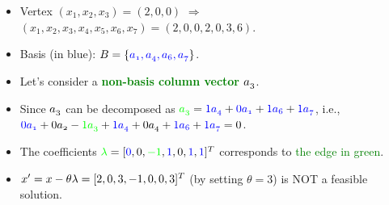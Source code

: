 \documentclass[mathserif]{beamer}
\begin{document}
{\begin{scriptsize}

\begin{itemize}
 \item Vertex  $(x_1,x_2,x_3)=(2,0, 0)$ $\Rightarrow$ $(x_1,x_2,x_3,x_4,x_5,x_6,x_7) = ( 2, 0, 0, 2, 0, 3, 6 )$.
  \item Basis (in blue): $\mathnormal{B =\{ \textcolor{blue}{a_1, a_4, a_6, a_7} \} }$.
 \item  Let's consider a \textcolor{green}{\bf non-basis column vector $\mathnormal{a_3}$}. 
 \item  Since $\mathnormal{a_3}$ can be decomposed as  $\mathnormal{ \textcolor{green}{a_{3}} }=   \textcolor{blue}{1 \mathnormal{a_{4}} } + \textcolor{blue}{0 \mathnormal{a_{1}} }  + \textcolor{blue}{1 \mathnormal{a_{6}} }   + \textcolor{blue}{1 \mathnormal{a_{7}}}$, i.e., 
 $\textcolor{blue}{0 \mathnormal{a_{1}} }  +  \textcolor{black}{0 \mathnormal{a_{2}} } -  \textcolor{green}{1 \mathnormal{a_{3}} }  +  \textcolor{blue}{1 \mathnormal{a_{4}} } +  \textcolor{black}{0 \mathnormal{a_{4}} } + \textcolor{blue}{1 \mathnormal{a_{6}} }   + \textcolor{blue}{1 \mathnormal{a_{7}}} = 0$.
  \item The coefficients   $ \textcolor{green} { \mathnormal{\lambda}} = [ \textcolor{blue}{0}, 0, \textcolor{green}{-1},  \textcolor{blue}{1}, 0,  \textcolor{blue}{1},  \textcolor{blue}{1} ]^T$ corresponds to \textcolor{green}{the  edge in green}. 
    \item $\mathnormal{x'=x-\theta \lambda} = [ 2,0,3,-1,0,0,3]^T$ (by setting $\theta=3$) is NOT a feasible solution.
\end{itemize}
\end{scriptsize}
}
\end{document}

